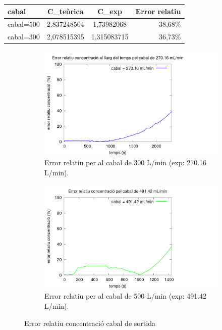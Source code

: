 \documentclass[10pt, twoside]{article}
\begin{document}
\begin{minipage}{\textwidth}
    \centering
    \label{tab:calibomba}
    \begin{tabular}{|l|c|c|r|}
        \hline
        cabal       &	C_{teòrica}	&	C_{exp}	    &   Error relatiu	\\ \hline
        cabal=500	&	2,837248504	&	1,73982068	&	38,68$\%$	\\ \hline
        cabal=300	&	2,078515395	&	1,315083715	&	36,73$\%$	\\ \hline

    \end{tabular}
\end{minipage}

\begin{figure}[hbt!]
    \centering
    \begin{subfigure}{0.45\textwidth}
        \centering
        \includegraphics[width=\textwidth]{error300.png}
        \caption{Error relatiu per al cabal de 300 L/min (exp: 270.16 L/min).}
        \label{fig:error300}
    \end{subfigure}
    \hspace{0.025\textwidth}
    \begin{subfigure}{0.45\textwidth}
        \centering
        \includegraphics[width=\textwidth]{error500.png}
        \caption{Error relatiu per al cabal de 500 L/min (exp: 491.42 L/min).}
        \label{fig:error500}
    \end{subfigure}
    \caption{Error relatiu concentració cabal de sortida}
    \label{fig:errors}
\end{figure}
\end{document}
